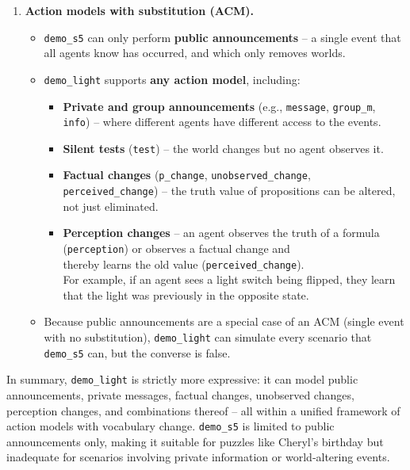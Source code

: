\begin{enumerate}
    \item \textbf{Action models with substitution (ACM).}
        \begin{itemize}
            \item \texttt{demo\_s5} can only perform 
            \textbf{public announcements} – a single event that all agents 
            know has occurred, and which only removes worlds.
            \item \texttt{demo\_light} supports \textbf{any action model}, including:
                \begin{itemize}
                    \item \textbf{Private and group announcements} 
                    (e.g., \texttt{message}, \texttt{group\_m}, \texttt{info}) 
                    – where different agents have different access to the events.
                    \item \textbf{Silent tests} (\texttt{test}) 
                    – the world changes but no agent observes it.
                    \item \textbf{Factual changes} (\texttt{p\_change}, 
                    \texttt{unobserved\_change}, \texttt{perceived\_change}) 
                    – the truth value of propositions can be altered, 
                    not just eliminated.
                    \item \textbf{Perception changes} – an agent 
                    observes the truth of a formula \\ 
                    (\texttt{perception}) or observes a factual change and \\ 
                    thereby learns the
                    old value (\texttt{perceived\_change}). \\
                    For example, if an agent sees a light switch being flipped, 
                    they learn that the light was previously in the opposite state.
                \end{itemize}
            \item Because public announcements are a special case of an ACM 
            (single event with no substitution), \texttt{demo\_light} 
            can simulate every scenario that \texttt{demo\_s5} can, 
            but the converse is false.
        \end{itemize}
\end{enumerate}

In summary, \texttt{demo\_light} is strictly more expressive: 
it can model public announcements, private messages, 
factual changes, unobserved changes, perception changes, 
and combinations thereof – all within a unified framework 
of action models with vocabulary change. \texttt{demo\_s5} 
is limited to public announcements only, making it suitable 
for puzzles like Cheryl’s birthday but inadequate 
for scenarios involving private information or world‑altering events.

